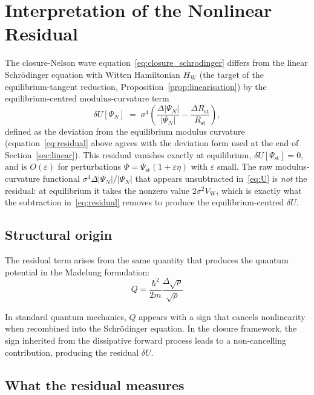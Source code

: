 \documentclass[12pt]{article}
\newcommand{\VW}{V_{\mathrm{W}}}
\begin{document}
\section{Interpretation of the Nonlinear Residual}\label{sec:residual}

The closure-Nelson wave equation~\eqref{eq:closure_schrodinger} differs from the linear Schr\"odinger equation with Witten Hamiltonian $H_{\mathrm{W}}$ (the target of the equilibrium-tangent reduction, Proposition~\ref{prop:linearisation}) by the equilibrium-centred modulus-curvature term
\begin{equation}\label{eq:residual}
    \delta U[\Psi_N] \;=\; \sigma^4\!\left(\frac{\Delta|\Psi_N|}{|\Psi_N|} - \frac{\Delta R_{\mathrm{st}}}{R_{\mathrm{st}}}\right),
\end{equation}
defined as the deviation from the equilibrium modulus curvature (equation~\eqref{eq:residual} above agrees with the deviation form used at the end of Section~\ref{sec:linear}). This residual vanishes exactly at equilibrium, $\delta U[\Psi_{\mathrm{st}}] = 0$, and is $O(\varepsilon)$ for perturbations $\Psi = \Psi_{\mathrm{st}}(1 + \varepsilon\eta)$ with $\varepsilon$ small. The raw modulus-curvature functional $\sigma^4 \Delta|\Psi_N|/|\Psi_N|$ that appears unsubtracted in~\eqref{eq:U} is \emph{not} the residual: at equilibrium it takes the nonzero value $2\sigma^2 \VW$, which is exactly what the subtraction in~\eqref{eq:residual} removes to produce the equilibrium-centred $\delta U$.

\subsection*{Structural origin}

The residual term arises from the same quantity that produces the quantum potential in the Madelung formulation:
\begin{equation}
    Q = \frac{\hbar^2}{2m}\frac{\Delta\sqrt{\rho}}{\sqrt{\rho}}
\end{equation}

In standard quantum mechanics, $Q$ appears with a sign that cancels nonlinearity when recombined into the Schr\"odinger equation. In the closure framework, the sign inherited from the dissipative forward process leads to a non-cancelling contribution, producing the residual $\delta U$.

\subsection*{What the residual measures}
\end{document}
